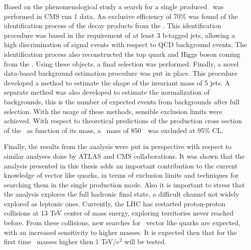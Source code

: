 Based on the phenomenological study a search for a single produced \Tp~was performed in CMS run 1 data. An exclusive efficiency of 70\% was found of the identification process of the decay products from the \Tp. This identification procedure was based in the requirement of at least 3 b-tagged jets, allowing a high discrimination of signal events with respect to QCD background events. The identification process also reconstructed the top quark and Higgs boson coming from the \Tp. Using these objects, a final selection was performed. Finally, a novel data-based background estimation procedure was put in place. This procedure developed a method to estimate the shape of the invariant mass of 5 jets. A separate method was also developed to estimate the normalization of backgrounds, this is the number of expected events from backgrounds after full selection. With the usage of these methods, sensible exclusion limits were achieved. With respect to theoretical predictions of the production cross section of the \Tp~as function of its mass, a \Tp~mass of 850~\GeVcc~was excluded at 95\% CL.

Finally, the results from the analysis were put in perspective with respect to similar analyses done by ATLAS and CMS collaborations. It was shown that the analysis presented in this thesis adds an important contribution to the current knowledge of vector like quarks, in terms of exclusion limits and techniques for searching them in the single production mode. Also it is important to stress that the analysis explores the full hadronic final state, a difficult channel not widely explored as leptonic ones. Currently, the LHC has restarted proton-proton collisions at 13 TeV center of mass energy, exploring territories never reached before. From these collisions, new searches for \Tp~vector like quarks are expected, with an increased sensitivity to higher masses. It is expected then that for the first time \Tp~masses higher then 1 TeV/$\text{c}^{2}$ will be tested.